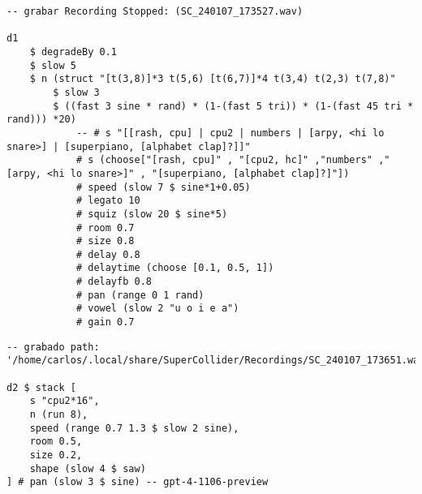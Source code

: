 \begin{minipage}[t]{1\textwidth}
    \centering
    \begin{lstlisting}[style=SuperCollider-IDE, language=ExtendedHaskell, basicstyle=\footnotesize\ttfamily, numbers=none]
-- grabar Recording Stopped: (SC_240107_173527.wav)

d1 
    $ degradeBy 0.1
    $ slow 5 
    $ n (struct "[t(3,8)]*3 t(5,6) [t(6,7)]*4 t(3,4) t(2,3) t(7,8)"
        $ slow 3 
        $ ((fast 3 sine * rand) * (1-(fast 5 tri)) * (1-(fast 45 tri * rand))) *20) 
            -- # s "[[rash, cpu] | cpu2 | numbers | [arpy, <hi lo snare>] | [superpiano, [alphabet clap]?]]" 
            # s (choose["[rash, cpu]" , "[cpu2, hc]" ,"numbers" ," [arpy, <hi lo snare>]" , "[superpiano, [alphabet clap]?]"])
            # speed (slow 7 $ sine*1+0.05) 
            # legato 10
            # squiz (slow 20 $ sine*5)
            # room 0.7
            # size 0.8
            # delay 0.8
            # delaytime (choose [0.1, 0.5, 1])
            # delayfb 0.8
            # pan (range 0 1 rand)
            # vowel (slow 2 "u o i e a")
            # gain 0.7               
    \end{lstlisting}
    \vspace{1cm}
\end{minipage}






\begin{minipage}[t]{1\textwidth}
    \centering
    \begin{lstlisting}[style=SuperCollider-IDE, language=ExtendedHaskell, basicstyle=\footnotesize\ttfamily, numbers=none]
-- grabado path: '/home/carlos/.local/share/SuperCollider/Recordings/SC_240107_173651.wav'

d2 $ stack [
    s "cpu2*16",
    n (run 8),
    speed (range 0.7 1.3 $ slow 2 sine),
    room 0.5,
    size 0.2,
    shape (slow 4 $ saw)
] # pan (slow 3 $ sine) -- gpt-4-1106-preview             
    \end{lstlisting}
    \vspace{1cm}
\end{minipage}





